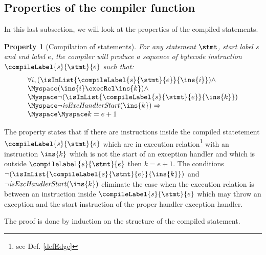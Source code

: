 \newtheorem{compProp1}{Property}[subsection] %
\newtheorem{compProp2}[compProp1]{Property} %
\newtheorem{compProp3}[compProp1]{Property} %
\newtheorem{seqInstr}{Definition}[subsection]

 
\newcommand{\isStartExc}[1]{\mbox{\rm\textit{isExcHandlerStart}}(#1)}
\subsection{Properties of the compiler function}

In this last subsection, we will look at the properties of the compiled statements.
 

\begin{compProp1}[Compilation of statements]\label{compProp1}
    For any statement $\stmt$, start label $s$ and end label $e$,
    the compiler will produce a sequence of bytecode instruction $\compileLabel{s}{\stmt}{e}$ such that: 
           $$ \begin{array}{l} 
                             \forall i, ( \isInList{\compileLabel{s}{\stmt}{e}}{\ins{i}} ) \wedge \\
			     \Myspace ( \ins{i} \execRel \ins{k}) \wedge \\
			     \Myspace \neg (  \isInList{\compileLabel{s}{\stmt}{e} }{\ins{k}} ) \\
			     \Myspace \neg \isStartExc{\ins{k}}     \Rightarrow   \\
                             \Myspace \Myspace k = e + 1
              \end{array}$$ 
\end{compProp1}
The property states that  if there are instructions inside the compiled statetement 
 $\compileLabel{s}{\stmt}{e}$ which are in execution relation\footnote{see Def. \ref{defEdge}}  with an instruction 
$\ins{k}$ which is not the start of an exception handler and which is outside $\compileLabel{s}{\stmt}{e}$
 then   $ k  = e +1$. 
 The conditions  $ \neg (  \isInList{\compileLabel{s}{\stmt}{e} }{\ins{k}} )$ and \\
$\neg \isStartExc{\ins{k}}$  eliminate the case when the execution relation is between an instruction inside 
 $\compileLabel{s}{\stmt}{e}$ which may throw an exception and the start instruction of the proper handler exception handler.

 The proof is done by induction on the structure of the compiled statement. 

